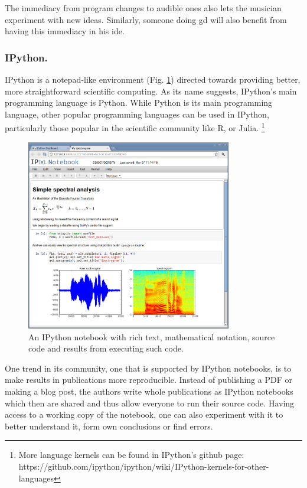 \documentclass{./llncs2e/llncs}
\begin{document}
	The immediacy from program changes to audible ones also lets the musician experiment with new ideas.
	Similarly, someone doing \ac{gd} will also benefit from having this immediacy in his \ac{ide}.
	
	
\subsubsection{IPython.}
	IPython\cite{PER-GRA:2007} is a notepad-like environment (Fig. \ref{fig:ipython:notebook}) directed towards providing better, more straightforward scientific computing. 
	As its name suggests, IPython's main programming language is Python. 
	While Python is its main programming language, other popular programming languages can be used in IPython, particularly those popular in the scientific community like R, or Julia.
	\footnote{More language kernels can be found in IPython's github page: https://github.com/ipython/ipython/wiki/IPython-kernels-for-other-languages}
		
	\begin{figure}
		\centering
		\includegraphics[width=0.8\textwidth]{img/ipython_notebook}
		\caption{An IPython notebook with rich text, mathematical notation, source code and results from executing such code.}
		\label{fig:ipython:notebook}
	\end{figure}
	
	One trend in its community, one that is supported by IPython notebooks, is to make results in publications more reproducible. 
	Instead of publishing a PDF or making a blog post, the authors write whole publications as IPython notebooks which then are shared and thus allow everyone to run their source code. 
	Having access to a working copy of the notebook, one can also experiment with it to better understand it, form own conclusions or find errors.
	
\end{document}
